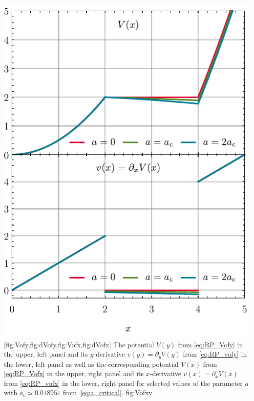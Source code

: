	{\vspace{-0.06cm}\includegraphics[width=\subcaptionFigureWidth-0.145cm]{0d/figures/Vofx.pdf}} %
	[fig:Vofy,fig:dVofy,fig:Vofx,fig:dVofx]
	{%
		The potential $V ( y )$ from \cref{eq:RP_Vofy} in the upper, left panel  and its $y$-derivative $v ( y ) = \partial_y V ( y )$ from \cref{eq:RP_vofy} in the lower, left panel
		 as well as the corresponding potential $V ( x )$ from \cref{eq:RP_Vofx} in the upper, right panel  and its $x$-derivative $v ( x ) = \partial_x V ( x )$ from \cref{eq:RP_vofx} in the lower, right panel  for selected values of the parameter $a$ \dash{} with ${a_\mathrm{c}\simeq 0.018951}$ from~\cref{eq:a_critical}.
	}%
	{fig:Vofxy}
\FloatBarrier

